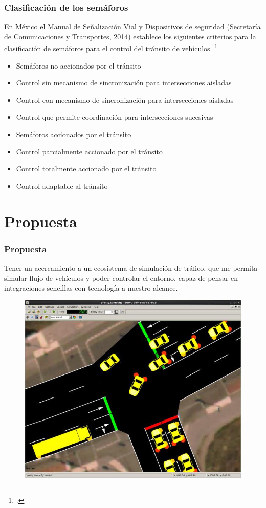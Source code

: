 \documentclass[
	11pt, %
]{beamer}
\begin{document}
\begin{frame}
  \frametitle{Clasificación de los semáforos}
  
  En México el Manual de Señalización Vial y Dispositivos de seguridad (Secretaría de Comunicaciones y Transportes, 2014) establece los siguientes criterios para la clasificación de semáforos para el control del tránsito de vehículos. \footcite{tesis}
  \bigskip %

  \begin{itemize}
  \item Semáforos no accionados por el tránsito
  \item Control sin mecanismo de sincronización para intersecciones aisladas
  \item Control con mecanismo de sincronización para intersecciones aisladas
  \item Control que permite coordinación para intersecciones sucesivas
  \end{itemize}

\end{frame}

\begin{frame}

  \begin{itemize}
  \item Semáforos accionados por el tránsito
  \item Control parcialmente accionado por el tránsito
  \item Control totalmente accionado por el tránsito
  \item Control adaptable al tránsito
  \end{itemize}
\end{frame}

\section{Propuesta}
\begin{frame}
  \frametitle{Propuesta}

  Tener un acercamiento a un ecosistema de simulación de tráfico, que me permita simular flujo de vehículos y poder controlar el entorno, capaz de pensar en integraciones sencillas con tecnología a nuestro alcance. 

  \begin{figure}
    \includegraphics[width=0.5\linewidth]{sumo.jpg}
  \end{figure}
  
\end{frame}
\end{document}
